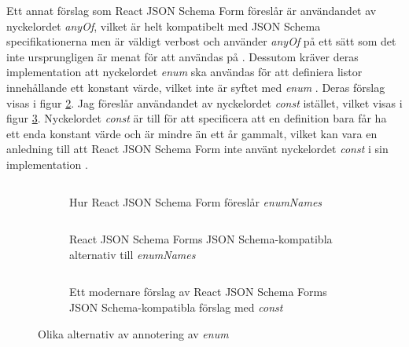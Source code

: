 Ett annat förslag som React JSON Schema Form föreslår är användandet av nyckelordet \textit{anyOf}, vilket är helt kompatibelt med JSON Schema specifikationerna men är väldigt verbost och använder \textit{anyOf} på ett sätt som det inte ursprungligen är menat för att användas på \cite{MozillaServices, Andrews2018}. Dessutom kräver deras implementation att nyckelordet \textit{enum} ska användas för att definiera listor innehållande ett konstant värde, vilket inte är syftet med \textit{enum} \cite{Andrews2018}. Deras förslag visas i figur \ref{fig:enum-example:any-of}. Jag föreslår användandet av nyckelordet \textit{const} istället, vilket visas i figur \ref{fig:enum-example:any-of-const}. Nyckelordet \textit{const} är till för att specificera att en definition bara får ha ett enda konstant värde och är mindre än ett år gammalt, vilket kan vara en anledning till att React JSON Schema Form inte använt nyckelordet \textit{const} i sin implementation \cite{Andrews2018}.

\begin{figure}
	\begin{subfigure}[t]{\textwidth}
		\inputminted[tabsize=2, frame=single, fontsize=\small, framesep=2mm, breaklines]{json}{code/enum-example/extra-array.json}
		\vspace{-1.2em}
		\caption{Hur React JSON Schema Form föreslår \textit{enumNames} \cite{MozillaServices}}
		\label{fig:enum-example:extra-array}
		\vspace{.8em}
	\end{subfigure}
	\begin{subfigure}[t]{0.47\textwidth}
		\inputminted[tabsize=2, frame=single, fontsize=\small, framesep=2mm, breaklines]{json}{code/enum-example/any-of.json}
		\vspace{-1.2em}
		\caption{React JSON Schema Forms JSON Schema-kompatibla alternativ till \textit{enumNames} \cite{MozillaServices}}
		\label{fig:enum-example:any-of}
	\end{subfigure}\hfill
	\begin{subfigure}[t]{0.47\textwidth}
		\inputminted[tabsize=2, frame=single, fontsize=\small, framesep=2mm, breaklines]{json}{code/enum-example/any-of-const.json}
		\vspace{-1.2em}
		\caption{Ett modernare förslag av React JSON Schema Forms JSON Schema-kompatibla förslag med \textit{const}}
		\label{fig:enum-example:any-of-const}
	\end{subfigure}
	\caption{Olika alternativ av annotering av \textit{enum}}
	\label{fig:enum-example:any-of-examples}
\end{figure}

